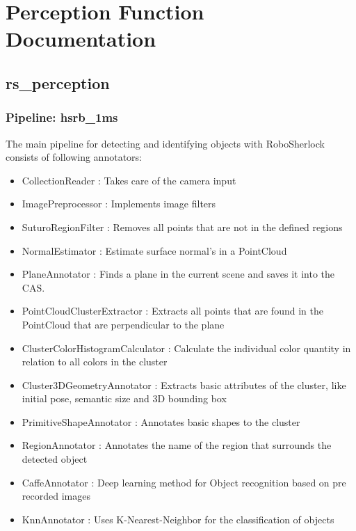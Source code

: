 \documentclass[main.tex]{subfiles}
\begin{document}
\begingroup

\renewcommand{\cleardoublepage}{}

\renewcommand{\clearpage}{}

\chapter{Perception Function Documentation}

		\section{rs\_perception}

			\subsection{Pipeline: hsrb\_1ms}

The main pipeline for detecting and identifying objects with RoboSherlock consists of following annotators:  
\begin{itemize}
	\item CollectionReader : Takes care of the camera input
	\item ImagePreprocessor : Implements image filters
	\item SuturoRegionFilter : Removes all points that are not in the defined regions 
	\item NormalEstimator : Estimate surface normal's in a PointCloud 
	\item PlaneAnnotator : Finds a plane in the current scene and saves it into the CAS.
	\item PointCloudClusterExtractor : Extracts all points that are found in the PointCloud that are perpendicular to the plane 
	\item ClusterColorHistogramCalculator : Calculate the individual color quantity in relation to all colors in the cluster   
	\item Cluster3DGeometryAnnotator : Extracts basic attributes of the cluster, like initial pose, semantic size and 3D bounding box 
	\item PrimitiveShapeAnnotator : Annotates basic shapes to the cluster
	\item RegionAnnotator : Annotates the name of the region that surrounds the detected object
	\item CaffeAnnotator : Deep learning method for Object recognition based on pre recorded images 
	\item KnnAnnotator : Uses K-Nearest-Neighbor for the classification of objects 
\end{itemize}
\end{document}
